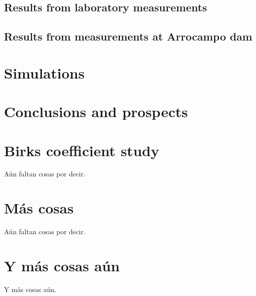 \documentclass[12pt,a4paper]{book}
\begin{document}
	\section{Results from laboratory measurements}
	\newpage
		
	\section{Results from measurements at Arrocampo dam}
	\newpage	

\chapter{Simulations}  \label{chap:Simulations}
%
\newpage	

\chapter{Conclusions and prospects}  \label{chap:Conclusions}
%
\newpage


\appendix
\appendixpage
\noappendicestocpagenum
\addappheadtotoc

\chapter{Birks coefficient study}\label{App:Birks}
Aún faltan cosas por decir.

\chapter{Más cosas}\label{App:A}
Aún faltan cosas por decir.

\chapter{Y más cosas aún}\label{App:B}
Y más cosas aún.


\end{document}
